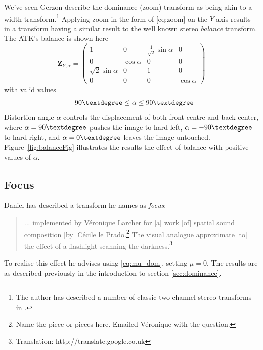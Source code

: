 \documentclass[12pt]{article}
\begin{document}
We've seen Gerzon describe the dominance (zoom) transform as being akin to a width transform.\footnote{The author has described a number of classic two-channel stereo transforms in \cite{anderson:09b}.} Applying zoom in the form of \eqref{eq:zoom} on the \(Y\) axis results in a transform having a similar result to the well known stereo {\em balance} transform. The ATK's balance is shown here \begin{equation}	\label{eq:balance}
\mathbf{Z}_{Y, \alpha} = \begin{pmatrix}
	1 & 0 & \frac{1}{\sqrt{2}}\sin{\alpha} & 0\\
	0 & \cos{\alpha} & 0 & 0\\
	\sqrt{2}\sin{\alpha} & 0 & 1 & 0\\
	0 & 0 & 0 & \cos{\alpha}
\end{pmatrix}
\end{equation} with valid values \begin{equation}
	-90\textdegree \leq \alpha \leq 90\textdegree
\end{equation} Distortion angle \(\alpha\) controls the displacement of both front-centre and back-center, where \(\alpha = 90\textdegree\) pushes the image to hard-left, \(\alpha = -90\textdegree\) to hard-right, and \(\alpha = 0\textdegree\) leaves the image untouched. Figure~\ref{fig:balanceFig} illustrates the results the effect of balance with positive values of \(\alpha\).


\subsection{Focus}

Daniel \cite{daniel:01} has described a transform he names as {\em focus}:  \begin{quote} ... implemented by V\'{e}ronique Larcher for [a] work [of] spatial sound composition [by] C\'{e}cile le Prado.\footnote{Name the piece or pieces here. Emailed V\'{e}ronique with the question.} The visual analogue approximate [to] the effect of a flashlight scanning the darkness.\footnote{Translation: http://translate.google.co.uk}
\end{quote} To realise this effect he advises using \eqref{eq:mu_dom}, setting \(\mu = 0\). The results are as described previously in the introduction to section \ref{sec:dominance}.
\end{document}
